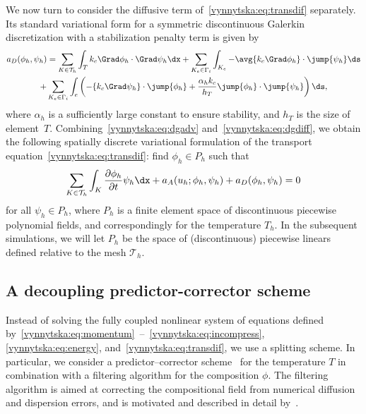 We now turn to consider the diffusive term
of~\eqref{vynnytska:eq:transdif} separately. Its standard variational form
for a symmetric discontinuous Galerkin discretization with a stabilization
penalty term is given by~\citep{Arnold1982}
\begin{multline}
  \label{vynnytska:eq:dgdiff}
    a_D(\phi_h, \psi_h)
    =
    \sum_{K \in \mathcal{T}_h} \int_T k_c \Grad \phi_h \cdot \Grad \psi_h \dx
    + \sum_{K_e \in \Gamma_i }
    \int_{K_e} - \avg{k_c \Grad \phi_h} \cdot \jump{\psi_h} \ds
\\
    + \sum_{K_e \in \Gamma_i} \int_{e} \left(
    - \{ k_c \Grad \psi_h\} \cdot \jump{\phi_h}
    + \frac{\alpha_h k_c}{h_T} \jump{\phi_h} \cdot \jump{\psi_h}
    \right) \ds,
\end{multline}
where $\alpha_h$ is a sufficiently large constant to ensure stability, and
$h_T$ is the size of element~$T$. Combining~\eqref{vynnytska:eq:dgadv}
and~\eqref{vynnytska:eq:dgdiff}, we obtain the following
spatially discrete variational formulation of the transport
equation~\eqref{vynnytska:eq:transdif}: find $\phi_h \in P_h$ such that
\begin{equation}
  \label{vynnytska:eq:semi_composition}
  \sum_{K \in \mathcal{T}_h} \int_K \frac{\partial \phi_h}{\partial t}\psi_h\dx
  + a_{A} (u_h; \phi_h, \psi_h) + a_D(\phi_h, \psi_h) = 0
\end{equation}
for all $\psi_h \in P_h$, where $P_h$ is a finite element space of
discontinuous piecewise polynomial fields, and correspondingly for the
temperature $T_h$. In the subsequent simulations, we will let $P_h$ be
the space of (discontinuous) piecewise linears defined relative to the
mesh $\mathcal{T}_h$.

\subsection{A decoupling predictor-corrector scheme}

Instead of solving the fully coupled nonlinear system of equations
defined
by~\eqref{vynnytska:eq:momentum}~--~\eqref{vynnytska:eq:incompress},
\eqref{vynnytska:eq:energy}, and~\eqref{vynnytska:eq:transdif}, we
use a splitting scheme. In particular, we consider a
predictor--corrector scheme~\citep{BergKekenYuen1993, HansenEbel1988}
for the temperature $T$ in combination with a filtering algorithm for
the composition $\phi$. The filtering algorithm is aimed at correcting
the compositional field from numerical diffusion and dispersion
errors, and is motivated and described in detail
by~\citet{LenardicKaula1993}.


